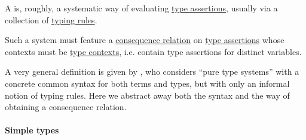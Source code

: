 \begin{definition}\label{def:abstract_type_system}\mimprovised
  A  is, roughly, a systematic way of evaluating \hyperref[def:type_assertion]{type assertions}, usually via a collection of \hyperref[con:typing_rule]{typing rules}.

  Such a system must feature a \hyperref[def:consequence_relation]{consequence relation} on \hyperref[def:type_assertion]{type assertions} whose contexts must be \hyperref[def:type_context]{type contexts}, i.e. contain type assertions for distinct variables.
\end{definition}
\begin{comments}
  \item A very general definition is given by , who considers \enquote{pure type systems} with a concrete common syntax for both terms and types, but with only an informal notion of typing rules. Here we abstract away both the syntax and the way of obtaining a consequence relation.
\end{comments}

\paragraph{Simple types}


